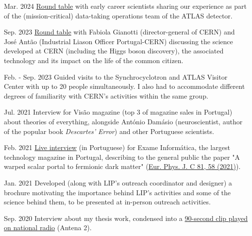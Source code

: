 
\begin{cventries}
    
    {}{Mar. 2024}
    {\href{https://indico.cern.ch/event/1378416/overview}{Round table} with early career scientists sharing our experience as part of the (mission-critical) data-taking operations team of the ATLAS detector.}

    {}{Sep. 2023}
    {\href{https://www.cienciaviva.pt/divulgacao-cientifica/o-bosao-de-higgs-e-as-nossas-vidas}{Round table} with Fabiola Gianotti (director-general of CERN) and José Antão (Industrial Liason Officer Portugal-CERN) discussing the science developed at CERN (including the Higgs boson discovery), the associated technology and its impact on the life of the common citizen.}

    {}{Feb. - Sep. 2023}
    {Guided visits to the Synchrocyclotron and ATLAS Visitor Center with up to 20 people simultaneously. I also had to accommodate different degrees of familiarity with CERN's activities within the same group.}

    {}{Jul. 2021}
    {Interview for Visão magazine (top 3 of magazine sales in Portugal) about theories of everything, alongside António Damásio (neuroscientist, author of the popular book \textit{Descartes' Error}) and other Portuguese scientists.}

    {}{Feb. 2021}
    {\href{https://visao.pt/exameinformatica/videos-ei/eilive/2021-02-08-cromo-da-semana-novas-particulas-atomicas-e-a-quinta-dimensao/}{Live interview} (in Portuguese) for Exame Informática, the largest technology magazine in Portugal, describing to the general public the paper "A warped scalar portal to fermionic dark matter" (\href{https://doi.org/10.1140/epjc/s10052-021-08851-0}{Eur. Phys. J. C 81, 58 (2021)}). }

    {}{Jan. 2021}
    {Developed (along with LIP's outreach coordinator and designer) a brochure motivating the importance behind LIP's activities and some of the science behind them, to be presented at in-person outreach activities.}

    {}{Sep. 2020}
    {Interview about my thesis work, condensed into a \href{https://www.rtp.pt/play/p2936/e491211/90-segundos-ciencia}{90-second clip played on national radio} (Antena 2).}

\end{cventries}